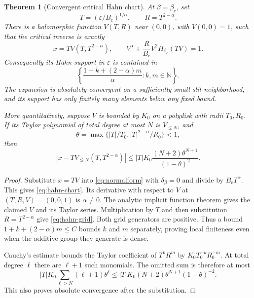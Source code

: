 \documentclass[11pt,a4paper]{article}
\numberwithin{equation}{section}
\newtheorem{theorem}{Theorem}[section]
\theoremstyle{definition}
\theoremstyle{remark}
\newcommand{\N}{\mathbb N}
\newcommand{\bc}{\beta_{\mathrm c}}
\newcommand{\Bc}{B_{\mathrm c}}
\begin{document}
\begin{theorem}[Convergent critical Hahn chart]
\label{thm:hahn}
At $\beta=\bc$, set
\[
 T=(\varepsilon/\Bc)^{1/\alpha},\qquad R=T^{2-\alpha}.
\]
There is a holomorphic function $V(T,R)$ near $(0,0)$, with $V(0,0)=1$,
such that the critical inverse is exactly
\begin{equation}\label{eq:hahn-chart}
 x=T V(T,T^{2-\alpha}),\qquad
 V^\alpha+\frac{R}{\Bc}V^2H_{\bc}(TV)=1.
\end{equation}
Consequently its Hahn support in $\varepsilon$ is contained in
\begin{equation}\label{eq:hahn-grid}
 \left\{\frac{1+k+(2-\alpha)m}{\alpha}:k,m\in\N\right\}.
\end{equation}
The expansion is absolutely convergent on a sufficiently small slit
neighborhood, and its support has only finitely many elements below any
fixed bound.

More quantitatively, suppose $V$ is bounded by $K_0$ on a polydisk with
radii $T_0,R_0$. If its Taylor polynomial of total degree at most $N$ is
$V_{\le N}$, and
\[
 \theta=\max\{|T|/T_0,|T|^{2-\alpha}/R_0\}<1,
\]
then
\begin{equation}\label{eq:hahn-remainder}
 |x-TV_{\le N}(T,T^{2-\alpha})|
 \le |T|K_0\frac{(N+2)\theta^{N+1}}{(1-\theta)^2}.
\end{equation}
\end{theorem}
\begin{proof}
Substitute $x=TV$ into \eqref{eq:normalform} with $\delta_\beta=0$ and
divide by $\Bc T^\alpha$. This gives \eqref{eq:hahn-chart}. Its derivative
with respect to $V$ at $(T,R,V)=(0,0,1)$ is $\alpha\ne0$. The analytic
implicit function theorem gives the claimed $V$ and its Taylor series.
Multiplication by $T$ and then substitution $R=T^{2-\alpha}$ give
\eqref{eq:hahn-grid}. Both grid generators are positive. Thus a bound
$1+k+(2-\alpha)m\le C$ bounds $k$ and $m$ separately, proving local
finiteness even when the additive group they generate is dense.

Cauchy's estimate bounds the Taylor coefficient of $T^kR^m$ by
$K_0T_0^{-k}R_0^{-m}$. At total degree $\ell$ there are $\ell+1$ such
monomials. The omitted sum is therefore at most
\[
 |T|K_0\sum_{\ell>N}(\ell+1)\theta^\ell
 \le |T|K_0(N+2)\theta^{N+1}(1-\theta)^{-2}.
\]
This also proves absolute convergence after the substitution.
\end{proof}
\end{document}
